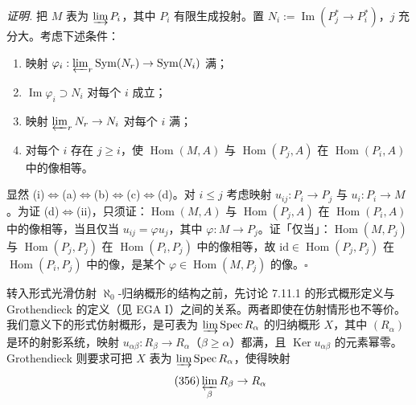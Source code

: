 \emph{证明.} 把 $M$ 表为 $\varinjlim P_i$，其中 $P_i$ 有限生成投射。置 $N_i:=\operatorname{Im}(P^{*}_j\to P^{*}_i)$，$j$ 充分大。考虑下述条件：
\begin{enumerate}[label=(\alph*),leftmargin=2.2em]
\item 映射 $\varphi_i:\varprojlim_r\operatorname{Sym}(N_r)\to\operatorname{Sym}(N_i)$ 满；
\item $\operatorname{Im}\varphi_i\supset N_i$ 对每个 $i$ 成立；
\item 映射 $\varprojlim_r N_r\to N_i$ 对每个 $i$ 满；
\item 对每个 $i$ 存在 $j\ge i$，使 $\operatorname{Hom}(M,A)$ 与 $\operatorname{Hom}(P_j,A)$ 在 $\operatorname{Hom}(P_i,A)$ 中的像相等。
\end{enumerate}
显然 (i)$\Leftrightarrow$(a)$\Leftrightarrow$(b)$\Leftrightarrow$(c)$\Leftrightarrow$(d)。对 $i\le j$ 考虑映射 $u_{ij}:P_i\to P_j$ 与 $u_i:P_i\to M$。为证 (d)$\Leftrightarrow$(ii)，只须证：$\operatorname{Hom}(M,A)$ 与 $\operatorname{Hom}(P_j,A)$ 在 $\operatorname{Hom}(P_i,A)$ 中的像相等，当且仅当 $u_{ij}=\varphi u_j$，其中 $\varphi:M\to P_j$。证「仅当」：$\operatorname{Hom}(M,P_j)$ 与 $\operatorname{Hom}(P_j,P_j)$ 在 $\operatorname{Hom}(P_i,P_j)$ 中的像相等，故 $\mathrm{id}\in\operatorname{Hom}(P_j,P_j)$ 在 $\operatorname{Hom}(P_i,P_j)$ 中的像，是某个 $\varphi\in\operatorname{Hom}(M,P_j)$ 的像。\hfill$\square$

 转入形式光滑仿射 $\aleph_0$-归纳概形的结构之前，先讨论 7.11.1 的形式概形定义与 Grothendieck 的定义（见 EGA I）之间的关系。两者即使在仿射情形也不等价。我们意义下的形式仿射概形，是可表为 $\varinjlim\operatorname{Spec}R_\alpha$ 的归纳概形 $X$，其中 $(R_\alpha)$ 是环的射影系统，映射 $u_{\alpha\beta}:R_\beta\to R_\alpha$（$\beta\ge\alpha$）都满，且 $\operatorname{Ker}u_{\alpha\beta}$ 的元素幂零。Grothendieck 则要求可把 $X$ 表为 $\varinjlim\operatorname{Spec}R_\alpha$，使得映射
\begin{equation}\tag{356}
\varprojlim_\beta R_\beta\to R_\alpha
\end{equation}


